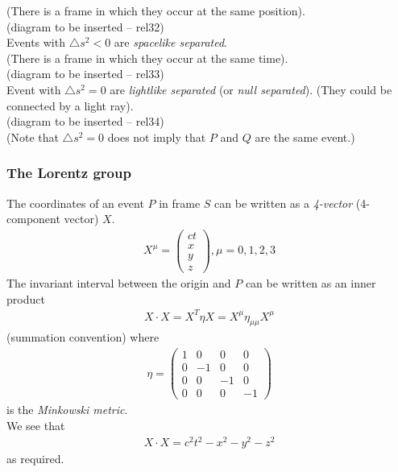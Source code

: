 \documentclass[a4paper]{article}
\begin{document}
(There is a frame in which they occur at the same position).\\
(diagram to be inserted -- rel32)\\
Events with $\triangle s^2 < 0$ are \emph{spacelike separated}.\\
(There is a frame in which they occur at the same time).\\
(diagram to be inserted -- rel33)\\
Event with $\triangle s^2=0$ are \emph{lightlike separated} (or \emph{null separated}). (They could be connected by a light ray).\\
(diagram to be inserted -- rel34)\\
(Note that $\triangle s^2 = 0$ does not imply that $P$ and $Q$ are the same event.)

\subsubsection{The Lorentz group}
The coordinates of an event $P$ in frame $S$ can be written as a \emph{4-vector} (4-component vector) $X$.
\begin{equation*}
\begin{aligned}
X^\mu = \left(
\begin{array}{ll}
ct\\
x\\
y\\
z
\end{array}
\right), \mu = 0,1,2,3
\end{aligned}
\end{equation*}
The invariant interval between the origin and $P$ can be written as an inner product
\begin{equation*}
\begin{aligned}
X\cdot X = X^T \eta X = X^\mu \eta_{\mu\mu} X^\mu
\end{aligned}
\end{equation*}
(summation convention) where
\begin{equation*}
\begin{aligned}
\eta = \left(
\begin{matrix}
1&0&0&0\\
0&-1&0&0\\
0&0&-1&0\\
0&0&0&-1
\end{matrix}
\right)
\end{aligned}
\end{equation*}
is the \emph{Minkowski metric}.\\
We see that
\begin{equation*}
\begin{aligned}
X\cdot X = c^2 t^2 - x^2 - y^2 - z^2
\end{aligned}
\end{equation*}
as required.\\
\end{document}
